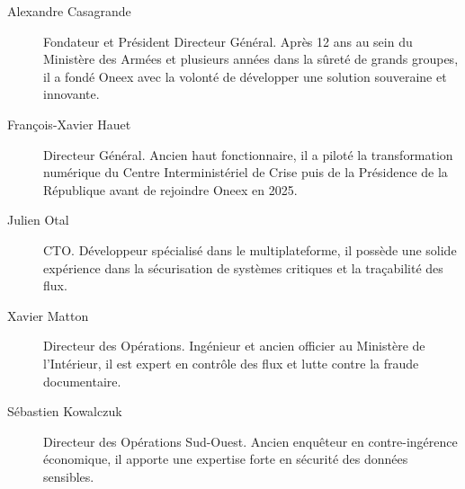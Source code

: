 \begin{description}
	\item[Alexandre Casagrande] Fondateur et Président Directeur Général. Après 12 ans au sein du Ministère des Armées et plusieurs années dans la sûreté de grands groupes, il a fondé Oneex avec la volonté de développer une solution souveraine et innovante.

	\item[François-Xavier Hauet] Directeur Général. Ancien haut fonctionnaire, il a piloté la transformation numérique du Centre Interministériel de Crise puis de la Présidence de la République avant de rejoindre Oneex en 2025.

	\item[Julien Otal] CTO. Développeur spécialisé dans le multiplateforme, il possède une solide expérience dans la sécurisation de systèmes critiques et la traçabilité des flux.

	\item[Xavier Matton] Directeur des Opérations. Ingénieur et ancien officier au Ministère de l’Intérieur, il est expert en contrôle des flux et lutte contre la fraude documentaire.


	\item[Sébastien Kowalczuk] Directeur des Opérations Sud-Ouest. Ancien enquêteur en contre-ingérence économique, il apporte une expertise forte en sécurité des données sensibles.
\end{description}


